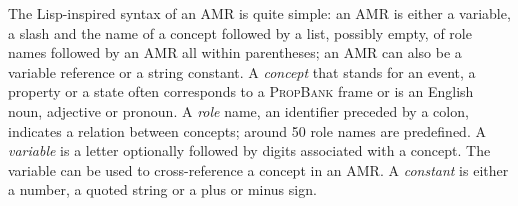 \documentclass[12pt]{article}
\newcommand{\systeme}[1]{\textsc{#1}}
\newcommand{\propbank}{\systeme{PropBank}}
\newcommand{\representation}[1]{\textsf{#1}}
\newcommand{\AMR}{\representation{AMR}}
\begin{document}
The Lisp-inspired syntax of an \AMR{} is quite simple: an \AMR{} is either a variable, a slash and the name of a concept followed by a list, possibly empty, of role names followed by an \AMR{} all within parentheses; an \AMR{} can also be a variable reference or a string constant. 
%
A \emph{concept} that stands for an event, a property or a state often corresponds to a \propbank{} frame or is an English noun, adjective or pronoun. A \emph{role} name, an identifier preceded by a colon, indicates a relation between concepts; around 50 role names are predefined. A \emph{variable} is a letter optionally followed by digits associated with a concept. The variable can be used to cross-reference a concept in an \AMR{}. A \emph{constant} is either a number, a quoted string or a plus or minus sign. 
\end{document}
